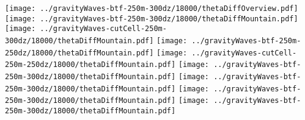 \documentclass{article}
\begin{document}
\centering
\texttt{[image: ../gravityWaves-btf-250m-300dz/18000/thetaDiffOverview.pdf]}
\vspace*{0.1in}
\texttt{[image: ../gravityWaves-btf-250m-300dz/18000/thetaDiffMountain.pdf]}
\texttt{[image: ../gravityWaves-cutCell-250m-300dz/18000/thetaDiffMountain.pdf]}
\vspace*{0.1in}
\texttt{[image: ../gravityWaves-btf-250m-250dz/18000/thetaDiffMountain.pdf]}
\texttt{[image: ../gravityWaves-cutCell-250m-250dz/18000/thetaDiffMountain.pdf]}
\vspace*{0.1in}
\texttt{[image: ../gravityWaves-btf-250m-300dz/18000/thetaDiffMountain.pdf]}
\texttt{[image: ../gravityWaves-btf-250m-300dz/18000/thetaDiffMountain.pdf]}
\vspace*{0.1in}
\texttt{[image: ../gravityWaves-btf-250m-300dz/18000/thetaDiffMountain.pdf]}
\texttt{[image: ../gravityWaves-btf-250m-300dz/18000/thetaDiffMountain.pdf]}
\end{document}
